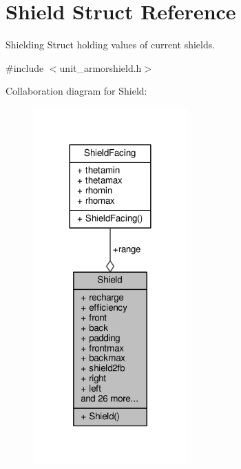 \hypertarget{structShield}{}\section{Shield Struct Reference}
\label{structShield}


Shielding Struct holding values of current shields.  




{\ttfamily \#include $<$unit\+\_\+armorshield.\+h$>$}



Collaboration diagram for Shield\+:
\nopagebreak
\begin{figure}[H]
\begin{center}
\leavevmode
\includegraphics[width=168pt]{d9/d65/structShield__coll__graph}
\end{center}
\end{figure}
